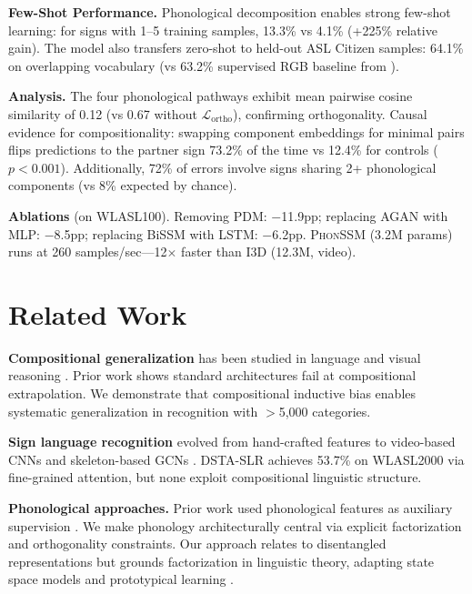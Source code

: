 \documentclass{article}
\newcommand{\phonssm}{\textsc{PhonSSM}}
\begin{document}
\textbf{Few-Shot Performance.} Phonological decomposition enables strong few-shot learning: for signs with 1--5 training samples, 13.3\% vs 4.1\% (+225\% relative gain). The model also transfers zero-shot to held-out ASL Citizen samples: 64.1\% on overlapping vocabulary (vs 63.2\% supervised RGB baseline from \citet{desai2023asl}).

\textbf{Analysis.} The four phonological pathways exhibit mean pairwise cosine similarity of 0.12 (vs 0.67 without $\mathcal{L}_{\text{ortho}}$), confirming orthogonality. Causal evidence for compositionality: swapping component embeddings for minimal pairs flips predictions to the partner sign 73.2\% of the time vs 12.4\% for controls ($p{<}0.001$). Additionally, 72\% of errors involve signs sharing 2+ phonological components (vs 8\% expected by chance).

\textbf{Ablations} (on WLASL100). Removing PDM: $-$11.9pp; replacing AGAN with MLP: $-$8.5pp; replacing BiSSM with LSTM: $-$6.2pp. \phonssm{} (3.2M params) runs at 260 samples/sec---12$\times$ faster than I3D (12.3M, video).

\section{Related Work}

\textbf{Compositional generalization} has been studied in language \citep{lake2018generalization} and visual reasoning \citep{bahdanau2019systematic}. Prior work shows standard architectures fail at compositional extrapolation. We demonstrate that compositional inductive bias enables systematic generalization in recognition with $>$5,000 categories.

\textbf{Sign language recognition} evolved from hand-crafted features \citep{cooper2011sign} to video-based CNNs \citep{carreira2017quo} and skeleton-based GCNs \citep{yan2018spatial,li2020word,hu2024dsta}. DSTA-SLR achieves 53.7\% on WLASL2000 via fine-grained attention, but none exploit compositional linguistic structure.

\textbf{Phonological approaches.} Prior work used phonological features as auxiliary supervision \citep{koller2015continuous}. We make phonology architecturally central via explicit factorization and orthogonality constraints. Our approach relates to disentangled representations \citep{higgins2017beta} but grounds factorization in linguistic theory, adapting state space models \citep{gu2023mamba} and prototypical learning \citep{snell2017prototypical}.
\end{document}

